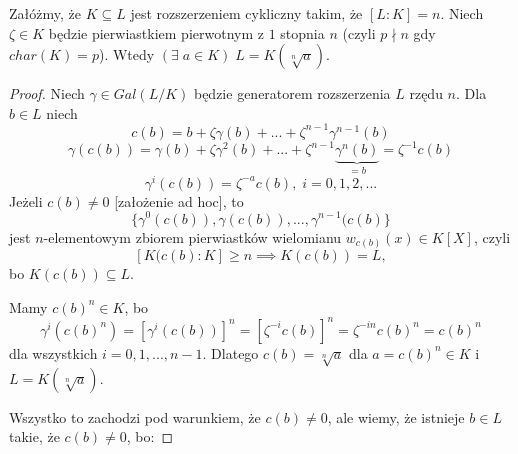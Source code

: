 \begin{theorem}\label{tw:9.4}
Załóżmy, że $K\subseteq L$ jest rozszerzeniem cykliczny takim, że $[L:K]=n$. Niech $\zeta\in K$ będzie pierwiastkiem pierwotnym z $1$ stopnia $n$ (czyli $p\nmid n$ gdy $char(K)=p$). Wtedy $(\exists\;a\in K)\;L=K(\sqrt[n]{a})$.
\end{theorem}
\begin{proof}
Niech $\gamma\in Gal(L/K)$ będzie generatorem rozszerzenia $L$ rzędu $n$. Dla $b\in L$ niech 
$$c(b)=b+\zeta\gamma(b)+...+\zeta^{n-1}\gamma^{n-1}(b)$$
$$\gamma(c(b))=\gamma(b)+\zeta\gamma^2(b)+...+\zeta^{n-1}\underbrace{\gamma^n(b)}_{=b}=\zeta^{-1}c(b)$$
$$\gamma^i(c(b))=\zeta^{-a}c(b),\;i=0,1,2,...$$
Jeżeli $c(b)\neq 0$ [założenie ad hoc], to
$$\{\gamma^0(c(b)),\gamma(c(b)), ...,\gamma^{n-1}(c(b)\}$$
jest $n$-elementowym zbiorem pierwiastków wielomianu $w_{c(b)}(x)\in K[X]$, czyli
$$[K(c(b):K]\geq n\implies K(c(b))=L,$$
bo $K(c(b))\subseteq L$. 

Mamy $c(b)^n\in K$, bo 
$$\gamma^i(c(b)^n)=\left[\gamma^i(c(b))\right]^n=[\zeta^{-i}c(b)]^n=\zeta^{-in}c(b)^n=c(b)^n$$
dla wszystkich $i=0,1,...,n-1$. Dlatego $c(b)=\sqrt[n]{a}$ dla $a=c(b)^n\in K$ i $L=K(\sqrt[n]{a})$.

Wszystko to zachodzi pod warunkiem, że $c(b)\neq 0$, ale wiemy, że istnieje $b\in L$ takie, że $c(b)\neq 0$, bo:
\end{proof}

